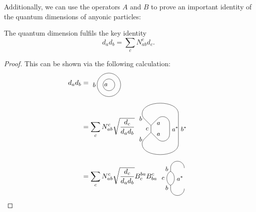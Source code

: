Additionally, we can use the operators $A$ and $B$ to prove an important identity of the quantum dimensions of anyonic particles: 
\begin{thm}
	\label{thm:qdimrelation}
	The quantum dimension fulfils the key identity
	\begin{equation}
	d_a d_b=\sum_c N_{ab}^c d_c.
	\end{equation}
\end{thm}
\begin{proof}
	This can be shown via the following calculation:
		\begin{align}
			d_a d_b&=\begin{tikzpicture}[scale=0.6,baseline=(current bounding box.center)]
				\draw (0,0) circle (0.5cm);
				\draw (0,0) circle (1cm);
				\node at (-0.25,0) {\small $a$};
				\node at (-1.25,0) {\small $b$};
			\end{tikzpicture}\\
			&=\sum_cN_{ab}^c\sqrt{\frac{d_c}{d_ad_b}}\ \begin{tikzpicture}[scale=0.7,baseline=(current bounding box.center)]
				\draw (0,0) to node[left] {\small $c$} (0,0.5);
				\draw (0,0.5) -- (0.5,1);	
				\draw (0,0.5) -- (-0.5,1);
				\draw (0,0) -- (-0.5,-0.5);
				\draw (0,0) -- (0.5,-0.5);
				\draw (0.5,1) arc (135:0:0.5cm);
				\draw (-0.5,1) arc (225:180:0.5cm);
				\begin{scope}[yscale=-1]
					\draw (0.5,0.5) arc (135:0:0.5cm);
					\draw (-0.5,0.5) arc (225:180:0.5cm);
					\draw (-0.645,0.85) to[bend left=90] (2,0.85);
				\end{scope}
				\draw (1.355,0.65) to node[right] {\small $a^*$} (1.355,-0.15);
				\draw (-0.645,1.35) to[bend left=90] (2,1.35);
				\draw (2,1.35) to node[right] {\small $b^*$} (2,-0.85);
				\node at (-0.75,1) {\small $b$};
				\node at (-0.75,-0.5) {\small $b$};
				\node at (0.55,0.65) {\small $a$};
				\node at (0.55,-0.15) {\small $a$};
			\end{tikzpicture}\\
			&=\sum_cN_{ab}^c\sqrt{\frac{d_c}{d_ad_b}}B_c^{ba}B_{ba}^c\ \begin{tikzpicture}[scale=0.7,baseline=(current bounding box.center)]
				\draw (0,0) to[bend left=70] node[left] {\small $c$} (0,1);
				\draw (0,0) to[bend right=70] node[right] {\small $a^*$} (0,1);
				\draw (0,0) to node [left, near end] {\small $b$} (0,-0.25);
				\draw (0,1) to node [left, near end] {\small $b$} (0,1.25);
				\draw (0,1.25) arc (180:0:0.5);
				\draw (0,-0.25) arc (-180:0:0.5);

\end{tikzpicture}
\end{align}
\end{proof}
